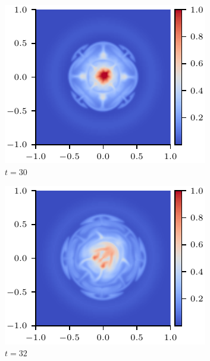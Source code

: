 \begin{figure}[t]
\begin{subfigure}{0.32\textwidth}
      \includegraphics[width=\linewidth]{swi-3_pressure_15.pdf}
      \caption{$t=30$}
      \label{fig:swi-3_pressure_15}
    \end{subfigure}
    \hfill
    \begin{subfigure}{0.32\textwidth}
      \includegraphics[width=\linewidth]{swi-3_pressure_16.pdf}
      \caption{$t=32$}
      \label{fig:swi-3_pressure_16}
    \end{subfigure}
    \hfill
    \begin{subfigure}{0.32\textwidth}

\end{subfigure}
\end{figure}
